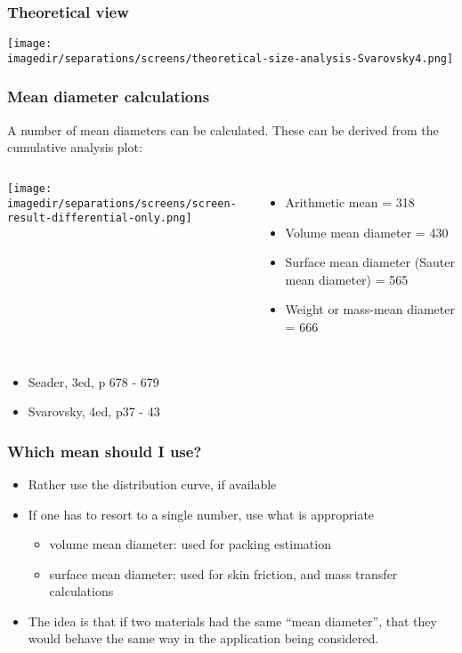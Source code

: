 \begin{frame}\frametitle{Theoretical view}
	\begin{center}
		\texttt{[image: \\imagedir/separations/screens/theoretical-size-analysis-Svarovsky4.png]}
	\end{center}
	\vfill
\end{frame}

\begin{frame}\frametitle{Mean diameter calculations}
	A number of mean diameters can be calculated. These can be derived from the cumulative analysis plot:
	\begin{columns}[c]
			\begin{center}
				\texttt{[image: \\imagedir/separations/screens/screen-result-differential-only.png]}
			\end{center}
		\small
			\begin{itemize}
				\item	Arithmetic mean = 318 \micron
				\item	Volume mean diameter = 430 \micron
				\item	Surface mean diameter (Sauter mean diameter) = 565 \micron
				\item	Weight or mass-mean diameter = 666 \micron
			\end{itemize}
	\end{columns}
	
	\vspace{12pt}
	\tiny
	\begin{itemize}
		\item	Seader, 3ed, p 678 - 679
		\item	Svarovsky, 4ed, p37 - 43
	\end{itemize}
\end{frame}

\begin{frame}\frametitle{Which mean should I use?}
	\begin{itemize}
		\item	Rather use the distribution curve, if available
		\item	If one has to resort to a single number, use what is appropriate
		\begin{itemize}
			\item	volume mean diameter: used for packing estimation
			\item	surface mean diameter: used for skin friction, and mass transfer calculations
		\end{itemize}
		
		\item	The idea is that if two materials had the same ``mean diameter'', that they would behave the same way in the application being considered.
	\end{itemize}
\end{frame}

